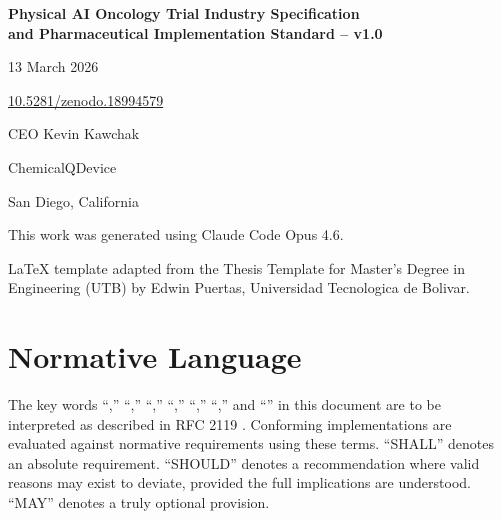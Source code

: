 \documentclass[11pt,letterpaper]{article}
\begin{document}
\begin{titlepage}
\centering
\vspace*{2cm}
{\LARGE\bfseries\color{PAIBlue} Physical AI Oncology Trial Industry Specification\\[0.3em]
and Pharmaceutical Implementation Standard -- v1.0\par}
\vspace{1.5cm}
{\large 13 March 2026\par}
\vspace{0.4cm}
{\large \href{https://doi.org/10.5281/zenodo.18994579}{10.5281/zenodo.18994579}\par}
\vspace{0.4cm}
{\large CEO Kevin Kawchak\par}
\vspace{0.4cm}
{\large ChemicalQDevice\par}
\vspace{0.4cm}
{\large San Diego, California\par}
\vfill
{\small This work was generated using Claude Code Opus 4.6.\par}
\vspace{0.5cm}
{\footnotesize LaTeX template adapted from the Thesis Template for Master's Degree in Engineering (UTB) by Edwin Puertas, Universidad Tecnologica de Bolivar.\par}
\end{titlepage}

\tableofcontents
\clearpage
{}

\section*{Normative Language}

The key words ``\SHALL,'' ``\SHOULD,'' ``\MAY,'' ``\MUST,'' ``\REQUIRED,'' ``\RECOMMENDED,'' and ``\OPTIONAL'' in this document are to be interpreted as described in RFC 2119 \cite{rfc2119}. Conforming implementations are evaluated against normative requirements using these terms. ``SHALL'' denotes an absolute requirement. ``SHOULD'' denotes a recommendation where valid reasons may exist to deviate, provided the full implications are understood. ``MAY'' denotes a truly optional provision.
\end{document}
